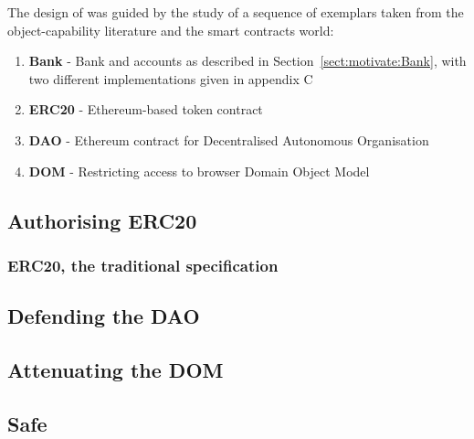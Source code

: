 


The design of \Chainmail was guided by the study of a sequence of
exemplars taken from the object-capability literature and the smart
contracts world:

\begin{enumerate}
\item \textbf{Bank} \cite{arnd18} - Bank and accounts as described in
Section~\ref{sect:motivate:Bank}, with two different implementations given in appendix C
\item
\textbf{ERC20} \cite{ERC20} - Ethereum-based token contract
\item
\textbf{DAO} \cite{Dao,DaoBug} - Ethereum contract for Decentralised Autonomous
Organisation
\item
\textbf{DOM} \cite{dd,ddd} - Restricting access to browser Domain Object Model\\
\end{enumerate}\vspace{-1em}

\subsection{Authorising ERC20}
\label{sect:example:ERC20}
{}

\subsubsection{ERC20, the traditional specification}
\label{ERC20:cont}


\subsection{Defending the DAO}
\label{Dao:appendix}


\subsection{Attenuating the DOM}
\label{sect:example:DOM}


\subsection{Safe}
\label{sect:exampleSafe}





